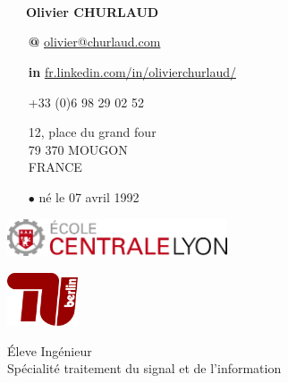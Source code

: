 \documentclass[skip,a4paper]{article}
\begin{document}
	\fontsize{8.5}{9.5}
	\selectfont

\begin{minipage}[c]{\linewidth}
	\begin{minipage}[c][4cm]{2.2cm}
		~\\~\\
		\vfill
		~
	\end{minipage}
	\begin{minipage}[c][4cm]{5.5cm}
		~~~\textbf{Olivier CHURLAUD}
		\footnotesize
		\begin{itemize}
			\item[\bfseries @] \url{olivier@churlaud.com}
			\item[\bfseries \color{blue} in] {\scriptsize\url{ fr.linkedin.com/in/olivierchurlaud/}}
			\item[\Telefon]+33 (0)6 98 29 02 52
			\item[\Letter] 12, place du grand four \\
			79 370 MOUGON \\ 
			FRANCE
			\item[$\bullet$] né le 07 avril 1992
		\end{itemize}
	\end{minipage}
	\begin{minipage}[c][4cm]{10cm}
		\begin{minipage}[c]{7.10cm}
			\includegraphics[width=6.5cm]{img/ecl}
		\end{minipage}
		\hfill
		\begin{minipage}[c]{2.5cm}
			\includegraphics[width=2.1cm]{img/tuberlin}
		\end{minipage}
		
		\vfill
		
		\centering
		\LARGE
		\'Eleve Ingénieur\\
		Spécialité traitement du signal et de l'information
\end{minipage}
\end{minipage}
\end{document}
